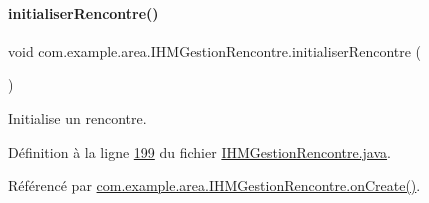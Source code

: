 \paragraph{\texorpdfstring{initialiser\+Rencontre()}{initialiserRencontre()}}
{\footnotesize\ttfamily void com.\+example.\+area.\+I\+H\+M\+Gestion\+Rencontre.\+initialiser\+Rencontre (\begin{DoxyParamCaption}{ }\end{DoxyParamCaption})\hspace{0.3cm}{\ttfamily [private]}}



Initialise un rencontre. 



Définition à la ligne \hyperlink{_i_h_m_gestion_rencontre_8java_source_l00199}{199} du fichier \hyperlink{_i_h_m_gestion_rencontre_8java_source}{I\+H\+M\+Gestion\+Rencontre.\+java}.



Référencé par \hyperlink{_i_h_m_gestion_rencontre_8java_source_l00064}{com.\+example.\+area.\+I\+H\+M\+Gestion\+Rencontre.\+on\+Create()}.


